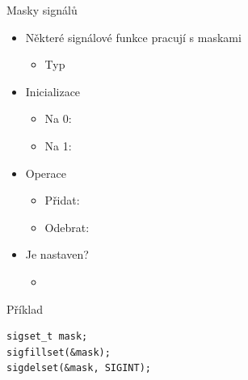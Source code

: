 \begin{frame}[fragile]{Masky signálů}

  \begin{itemize}
    \item Některé signálové funkce pracují s maskami
    \begin{itemize}
      \item Typ 
    \end{itemize}

    \pause

    \item Inicializace
    \begin{itemize}
      \item Na 0: 
      \item Na 1: 
    \end{itemize}

    \pause

    \item Operace
    \begin{itemize}
      \item Přidat: 
      \item Odebrat: 
    \end{itemize}

    \pause

    \item Je nastaven?
    \begin{itemize}
      \item {}
    \end{itemize}
  \end{itemize}

  \begin{block}{Příklad}
    \begin{lstlisting}[columns=fullflexible,aboveskip=2pt,belowskip=2pt]
sigset_t mask;
sigfillset(&mask);
sigdelset(&mask, SIGINT);
    \end{lstlisting}
  \end{block}

\end{frame}

\fi

